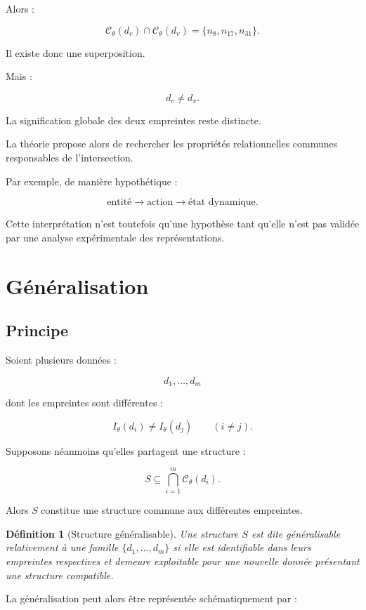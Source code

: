 \documentclass[11pt,a4paper]{article}
\newtheorem{definition}{Définition}[section]
\begin{document}
Alors :

\[
\mathcal C_\theta(d_c)
\cap
\mathcal C_\theta(d_v)
=
\{n_8,n_{17},n_{31}\}.
\]

Il existe donc une superposition.

Mais :

\[
d_c\neq d_v.
\]

La signification globale des deux empreintes reste distincte.

La théorie propose alors de rechercher les propriétés relationnelles
communes responsables de l'intersection.

Par exemple, de manière hypothétique :

\[
\text{entité}
\rightarrow
\text{action}
\rightarrow
\text{état dynamique}.
\]

Cette interprétation n'est toutefois qu'une hypothèse tant qu'elle n'est pas
validée par une analyse expérimentale des représentations.

\section{Généralisation}

\subsection{Principe}

Soient plusieurs données :

\[
d_1,\ldots,d_m
\]

dont les empreintes sont différentes :

\[
I_\theta(d_i)\neq I_\theta(d_j)
\qquad(i\neq j).
\]

Supposons néanmoins qu'elles partagent une structure :

\[
S
\subseteq
\bigcap_{i=1}^{m}
\mathcal C_\theta(d_i).
\]

Alors $S$ constitue une structure commune aux différentes empreintes.

\begin{definition}[Structure généralisable]
Une structure $S$ est dite généralisable relativement à une famille
$\{d_1,\ldots,d_m\}$ si elle est identifiable dans leurs empreintes
respectives et demeure exploitable pour une nouvelle donnée présentant une
structure compatible.
\end{definition}

La généralisation peut alors être représentée schématiquement par :
\end{document}
